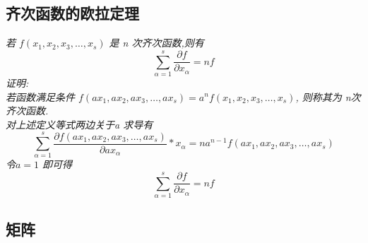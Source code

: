 \documentclass{scrartcl}
\numberwithin{equation}{section}
\begin{document}
\subsection{齐次函数的欧拉定理}
\textsl{若 $f(x_1, x_2, x_3, \dots, x_s)$ 是 n 次齐次函数,则有 }
\begin{equation}\sum_{\alpha=1}^s{\frac{\partial  f}{\partial x_{\alpha}}} = nf\end{equation}
\textsl{证明:\\
    若函数满足条件 $f(ax_1, ax_2, ax_3, \dots, ax_s) = a^n f(x_1, x_2, x_3, \dots, x_s)$, 则称其为 n次齐次函数. \\对上述定义等式两边关于a 求导有}
\begin{equation}
    \sum_{\alpha=1}^s{\frac{\partial f(ax_1, ax_2, ax_3, \dots, ax_s)}{\partial ax_{\alpha}}
    * x_\alpha = n a^{n-1} f(ax_1, ax_2, ax_3, \dots, ax_s)}
\end{equation}
\textsl{令$a =1$ 即可得}
\begin{equation}\sum_{\alpha = 1}^s{\frac{\partial  f}{\partial x_{\alpha}}} = nf\end{equation}
\subsection{矩阵}
\end{document}
